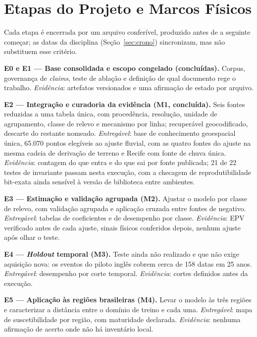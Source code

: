 \documentclass[conference]{IEEEtran}
\begin{document}
\section{Etapas do Projeto e Marcos Físicos}
\label{sec:etapas}

Cada etapa é encerrada por um arquivo conferível, produzido antes de a seguinte
começar; as datas da disciplina (Seção~\ref{sec:crono}) sincronizam, mas não
substituem esse critério.

\textbf{E0 e E1 --- Base consolidada e escopo congelado (concluídas).} Corpus,
governança de \emph{claims}, teste de ablação e definição de qual documento rege
o trabalho. \emph{Evidência}: artefatos versionados e uma afirmação de estado por
arquivo.

\textbf{E2 --- Integração e curadoria da evidência (M1, concluída).} Seis fontes
reduzidas a uma tabela única, com procedência, resolução, unidade de
agrupamento, classe de relevo e mecanismo por linha; recuperável geocodificado,
descarte do restante nomeado. \emph{Entregável}: base de conhecimento
geoespacial única, 65.070 pontos elegíveis ao ajuste fluvial, com as quatro
fontes do ajuste na mesma cadeia de derivação de terreno e Recife com fonte de
chuva única. \emph{Evidência}: contagem do que entra e do que sai por fonte
publicada; 21 de 22 testes de invariante passam nesta execução, com a
checagem de reprodutibilidade bit-exata ainda sensível à versão de biblioteca
entre ambientes.

\textbf{E3 --- Estimação e validação agrupada (M2).} Ajustar o modelo por classe
de relevo, com validação agrupada e aplicação cruzada entre fontes de negativo.
\emph{Entregável}: tabelas de coeficientes e de desempenho por classe.
\emph{Evidência}: EPV verificado antes de cada ajuste, sinais físicos conferidos
depois, nenhum ajuste após olhar o teste.

\textbf{E4 --- \emph{Holdout} temporal (M3).} Teste ainda não realizado e que não
exige aquisição nova: os eventos do piloto inglês cobrem cerca de 158 datas em 25
anos. \emph{Entregável}: desempenho por corte temporal. \emph{Evidência}: cortes
definidos antes da execução.

\textbf{E5 --- Aplicação às regiões brasileiras (M4).} Levar o modelo às três
regiões e caracterizar a distância entre o domínio de treino e cada uma.
\emph{Entregável}: mapa de suscetibilidade por região, com maturidade declarada.
\emph{Evidência}: nenhuma afirmação de acerto onde não há inventário local.
\end{document}
